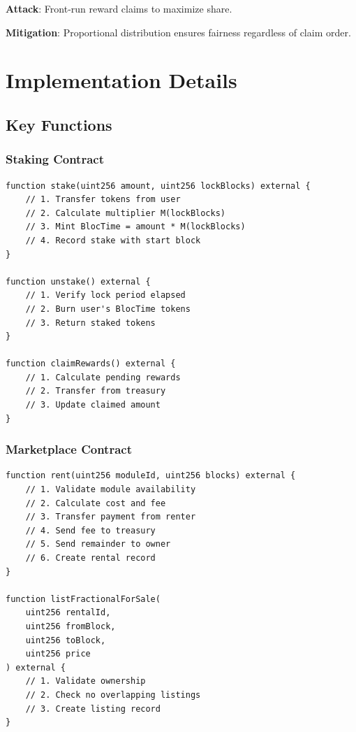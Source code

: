 \documentclass[12pt,a4paper]{article}
\begin{document}
\textbf{Attack}: Front-run reward claims to maximize share.

\textbf{Mitigation}: Proportional distribution ensures fairness regardless of claim order.

\section{Implementation Details}

\subsection{Key Functions}

\subsubsection{Staking Contract}

\begin{lstlisting}[language=Solidity]
function stake(uint256 amount, uint256 lockBlocks) external {
    // 1. Transfer tokens from user
    // 2. Calculate multiplier M(lockBlocks)
    // 3. Mint BlocTime = amount * M(lockBlocks)
    // 4. Record stake with start block
}

function unstake() external {
    // 1. Verify lock period elapsed
    // 2. Burn user's BlocTime tokens
    // 3. Return staked tokens
}

function claimRewards() external {
    // 1. Calculate pending rewards
    // 2. Transfer from treasury
    // 3. Update claimed amount
}
\end{lstlisting}

\subsubsection{Marketplace Contract}

\begin{lstlisting}[language=Solidity]
function rent(uint256 moduleId, uint256 blocks) external {
    // 1. Validate module availability
    // 2. Calculate cost and fee
    // 3. Transfer payment from renter
    // 4. Send fee to treasury
    // 5. Send remainder to owner
    // 6. Create rental record
}

function listFractionalForSale(
    uint256 rentalId,
    uint256 fromBlock,
    uint256 toBlock,
    uint256 price
) external {
    // 1. Validate ownership
    // 2. Check no overlapping listings
    // 3. Create listing record
}
\end{lstlisting}
\end{document}
